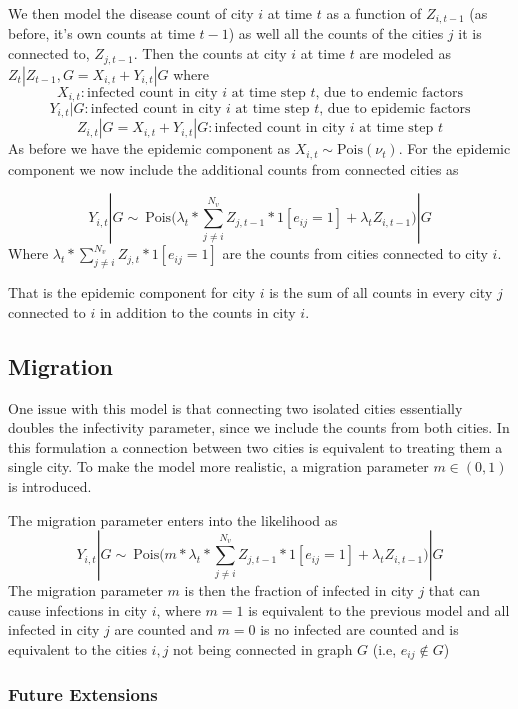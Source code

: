\documentclass[]{article}
\numberwithin{equation}{section}
\begin{document}
We then model the disease count of city \(i\) at time \(t\) as a
function of \(Z_{i,t-1}\) (as before, it's own counts at time \(t-1\))
as well all the counts of the cities \(j\) it is connected to,
\(Z_{j,t-1}\). Then the counts at city \(i\) at time \(t\) are modeled
as \(Z_t|Z_{t-1}, G = X_{i, t} + Y_{i,t}|G\) where
\[X_{i,t}: \text{infected count in city } i \text{ at time step } t \text{, due to endemic factors}   \]
\[Y_{i,t}|G : \text{infected count in city } i \text{ at time step } t \text{, due to epidemic factors}\]
\[Z_{i,t}|G = X_{i,t} + Y_{i,t}|G: \text{infected count in city } i \text{ at time step } t \]
As before we have the epidemic component as
\(X_{i,t} \sim\text{Pois}(\nu_t)\). For the epidemic component we now
include the additional counts from connected cities as

\[Y_{i,t}|G \sim ~ \text{Pois}\big(\lambda_t*\sum_{j\neq i}^{N_v}Z_{j,t-1}*1[e_{ij}=1]+ \lambda_tZ_{i,t-1}\big)|G \]
Where \(\lambda_t*\sum_{j\neq i}^{N_v}Z_{j,t}*1[e_{ij}=1]\) are the
counts from cities connected to city \(i\).

That is the epidemic component for city \(i\) is the sum of all counts
in every city \(j\) connected to \(i\) in addition to the counts in city
\(i\).

\hypertarget{migration}{%
\subsection{Migration}\label{migration}}

One issue with this model is that connecting two isolated cities
essentially doubles the infectivity parameter, since we include the
counts from both cities. In this formulation a connection between two
cities is equivalent to treating them a single city. To make the model
more realistic, a migration parameter \(m \in (0,1)\) is introduced.

The migration parameter enters into the likelihood as
\[Y_{i,t}|G \sim ~ \text{Pois}\big(m*\lambda_t*\sum_{j\neq i}^{N_v}Z_{j,t-1}*1[e_{ij}=1]+ \lambda_tZ_{i,t-1}\big)|G \]
The migration parameter \(m\) is then the fraction of infected in city
\(j\) that can cause infections in city \(i\), where \(m = 1\) is
equivalent to the previous model and all infected in city \(j\) are
counted and \(m = 0\) is no infected are counted and is equivalent to
the cities \(i,j\) not being connected in graph \(G\) (i.e,
\(e_{ij} \notin G\))

\hypertarget{future-extensions}{%
\subsubsection{Future Extensions}\label{future-extensions}}
\end{document}
